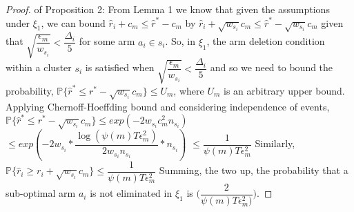 \begin{proof} of Proposition 2:
\newline
From Lemma 1 we know that given the assumptions under $\xi_{1}$, we can bound $\hat{r}_{i}+c_{m}\leq \hat{r}^{*}-c_{m}$ by $\hat{r}_{i} + \sqrt{w_{s_{i}}}c_{m} \leq \hat{r}^{*} - \sqrt{w_{s_{i}}}c_{m}$ given that $\sqrt{\dfrac{\epsilon_{m}}{w_{s_{i}}}}<\dfrac{\Delta_{i}}{5}$ for some arm $a_{i}\in s_{i}$. So, in $\xi_{1}$, the arm deletion condition within a cluster $s_{i}$ is satisfied when $\sqrt{\dfrac{\epsilon_{m}}{w_{s_{i}}}}<\dfrac{\Delta_{i}}{5}$ and so we need to bound the probability,
\newline\hspace*{4em} $\mathbb{P}\lbrace\hat{r}^{*}\leq r^{*} - \sqrt{w_{s_{i}}}c_{m}\rbrace\leq U_{m}$, where $U_{m}$ is an  arbitrary upper bound.
\newline
Applying Chernoff-Hoeffding bound and considering independence of events,
\newline
\newline\hspace*{0em} $\mathbb{P}\lbrace\hat{r}^{*}\leq r^{*} - \sqrt{w_{s_{i}}}c_{m}\rbrace\leq exp(-2w_{s_{i}}c_{m}^{2}n_{s_{i}})$
\newline\hspace*{2em} $\leq exp(-2 w_{s_{i}}* \dfrac{\log (\psi(m)T\epsilon_{m}^{2})}{2w_{s_{i}} n_{s_{i}}} *n_{s_{i}})$
\newline\hspace*{2em} $\leq \dfrac{1}{\psi(m)T\epsilon_{m}^{2}}$
\newline
Similarly, $\mathbb{P}\lbrace\hat{r}_{i}\geq r_{i} + \sqrt{w_{s_{i}}}c_{m}\rbrace\leq \dfrac{1}{\psi(m)T\epsilon_{m}^{2}}$
\newline
Summing, the two up, the probability that a sub-optimal arm $a_{i}$ is not eliminated in $\xi_{1}$ is  $\bigg(\dfrac{2}{\psi(m)T\epsilon_{m}^{2})}\bigg)$. 
\end{proof}

